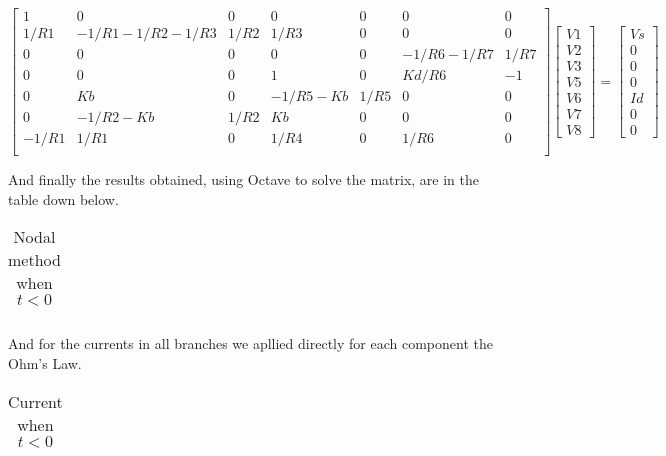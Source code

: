 $$
\begin{bmatrix} 
   1     & 0               & 0    & 0           & 0    & 0          & 0    \\
   1/R1  & -1/R1-1/R2-1/R3 & 1/R2 & 1/R3        & 0    & 0          & 0    \\
   0     & 0               & 0    & 0           & 0    & -1/R6-1/R7 & 1/R7 \\
   0     & 0               & 0    & 1           & 0    & Kd/R6      & -1   \\
   0     & Kb              & 0    & -1/R5-Kb    & 1/R5 & 0          & 0    \\
   0     & -1/R2-Kb        & 1/R2 & Kb          & 0    & 0          & 0    \\
   -1/R1 & 1/R1            & 0    & 1/R4        & 0    & 1/R6       & 0    \\
\end {bmatrix} 
\begin{bmatrix}
V1 \\ V2 \\ V3 \\ V5 \\ V6 \\ V7 \\ V8
\end {bmatrix} 
=
\begin{bmatrix} 
Vs \\ 0 \\ 0 \\ 0 \\ Id \\ 0 \\ 0
\end {bmatrix} 
$$ 


\vspace{0.5cm}
And finally the results obtained, using Octave to solve the matrix, are in the table down below. 


\FloatBarrier
\begin{table}[h]
  \centering
  \begin{tabular}{|c|c|c|c|c|c|c|}
    \hline    
    
    \hline
  \end{tabular}
  \caption{Nodal method when $t<0$}
  \label{tab:nodal}
\end{table}
\FloatBarrier 

And for the currents in all branches we apllied directly for each component the Ohm's Law. 

\FloatBarrier
\begin{table}[h]
  \centering
  \begin{tabular}{|c|c|c|c|c|c|c|}
    \hline    
    
    \hline
  \end{tabular}
  \caption{Current when $t<0$}
  \label{tab:nodal}
\end{table}
\FloatBarrier 


